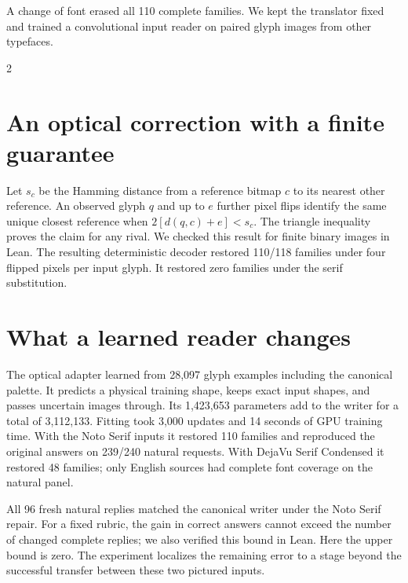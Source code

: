 \newpage
{}
\noindent A change of font erased all 110 complete families. We kept the translator fixed and trained a convolutional input reader on paired glyph images from other typefaces.
\begin{multicols}{2}
\section*{An optical correction with a finite guarantee}
Let $s_c$ be the Hamming distance from a reference bitmap $c$ to its nearest other reference. An observed glyph $q$ and up to $e$ further pixel flips identify the same unique closest reference when $2[d(q,c)+e]<s_c$. The triangle inequality proves the claim for any rival. We checked this result for finite binary images in Lean. The resulting deterministic decoder restored 110/118 families under four flipped pixels per input glyph. It restored zero families under the serif substitution.
\section*{What a learned reader changes}
The optical adapter learned from 28,097 glyph examples including the canonical palette. It predicts a physical training shape, keeps exact input shapes, and passes uncertain images through. Its 1,423,653 parameters add to the writer for a total of 3,112,133. Fitting took 3,000 updates and 14 seconds of GPU training time. With the Noto Serif inputs it restored 110 families and reproduced the original answers on 239/240 natural requests. With DejaVu Serif Condensed it restored 48 families; only English sources had complete font coverage on the natural panel.
\par All 96 fresh natural replies matched the canonical writer under the Noto Serif repair. For a fixed rubric, the gain in correct answers cannot exceed the number of changed complete replies; we also verified this bound in Lean. Here the upper bound is zero. The experiment localizes the remaining error to a stage beyond the successful transfer between these two pictured inputs.
\end{multicols}
